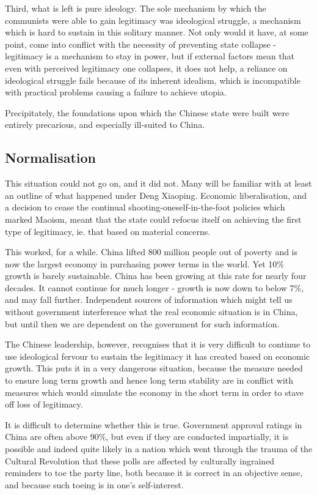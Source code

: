\documentclass[10pt,a4paper,twocolumn]{article}
\begin{document}
Third, what is left is pure ideology. The sole mechanism by which the communists were able to gain legitimacy was ideological struggle, a mechanism which is hard to sustain in this solitary manner. Not only would it have, at some point, come into conflict with the necessity of preventing state collapse - legitimacy is a mechanism to stay in power, but if external factors mean that even with perceived legitimacy one collapses, it does not help, a reliance on ideological struggle fails because of its inherent idealism, which is incompatible with practical problems causing a failure to achieve utopia.

Precipitately, the foundations upon which the Chinese state were built were entirely precarious, and especially ill-suited to China.

\subsection{Normalisation}

This situation could not go on, and it did not. Many will be familiar with at least an outline of what happened under Deng Xiaoping. Economic liberalisation, and a decision to cease the continual shooting-oneself-in-the-foot policies which marked Maoism, meant that the state could refocus itself on achieving the first type of legitimacy, ie. that based on material concerns.

This worked, for a while. China lifted 800 million people out of poverty and is now the largest economy in purchasing power terms in the world. Yet 10\% growth is barely sustainable. China has been growing at this rate for nearly four decades. It cannot continue for much longer - growth is now down to below 7\%, and may fall further. Independent sources of information which might tell us without government interference what the real economic situation is in China, but until then we are dependent on the government for such information.

The Chinese leadership, however, recognises that it is very difficult to continue to use ideological fervour to sustain the legitimacy it has created based on economic growth. This puts it in a very dangerous situation, because the measure needed to ensure long term growth and hence long term stability are in conflict with measures which would simulate the economy in the short term in order to stave off loss of legitimacy.

It is difficult to determine whether this is true. Government approval ratings in China are often above 90\%, but even if they are conducted impartially, it is possible and indeed quite likely in a nation which went through the trauma of the Cultural Revolution that these polls are affected by culturally ingrained reminders to toe the party line, both because it is correct in an objective sense, and because such toeing is in one's self-interest.
\end{document}
